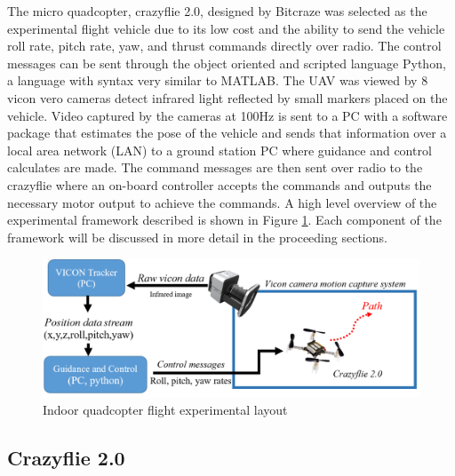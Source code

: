 \documentclass[numbered,pdftex]{ohio-etd}
\begin{document}
The micro quadcopter, crazyflie 2.0, designed by Bitcraze was selected as the experimental flight vehicle due to its low cost and the ability to send the vehicle roll rate, pitch rate, yaw, and thrust commands directly over radio. The control messages can be sent through the object oriented and scripted language Python, a language with syntax very similar to MATLAB. The UAV was viewed by 8 vicon vero cameras detect infrared light reflected by small markers placed on the vehicle. Video captured by the cameras at 100Hz is sent to a PC with a software package that estimates the pose of the vehicle and sends that information over a local area network (LAN) to a ground station PC where guidance and control calculates are made. The command messages are then sent over radio to the crazyflie where an on-board controller accepts the commands and outputs the necessary motor output to achieve the commands. A high level overview of the experimental framework described is shown in Figure \ref{fig:experimentalFramework}. Each component of the framework will be discussed in more detail in the proceeding sections. 

\begin{figure}
	\centering
	\includegraphics[trim=0 0 0 0,clip,width=16cm]{PaperFigures/Methods/experimentalSetup}
	\caption{Indoor quadcopter flight experimental layout}
	\label{fig:experimentalFramework}
\end{figure}

\subsection{Crazyflie 2.0}
\end{document}
